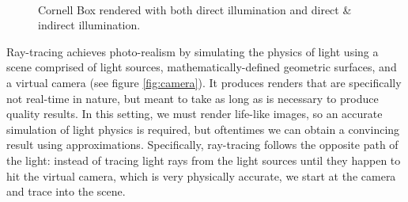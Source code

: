 \begin{figure}[h!]
    \centering
    ~
    \caption[Cornell Box direct \& indirect illumination]{Cornell Box rendered with both direct illumination and direct \& indirect illumination.}
    \label{fig:compare_illumination}
\end{figure}

Ray-tracing achieves photo-realism by simulating the physics of light using a scene comprised of light sources, mathematically-defined geometric surfaces, and a virtual camera (see figure \ref{fig:camera}). It produces renders that are specifically not real-time in nature, but meant to take as long as is necessary to produce quality results. In this setting, we must render life-like images, so an accurate simulation of light physics is required, but oftentimes we can obtain a convincing result using approximations. Specifically, ray-tracing follows the opposite path of the light: instead of tracing light rays from the light sources until they happen to hit the virtual camera, which is very physically accurate, we start at the camera and trace into the scene.

